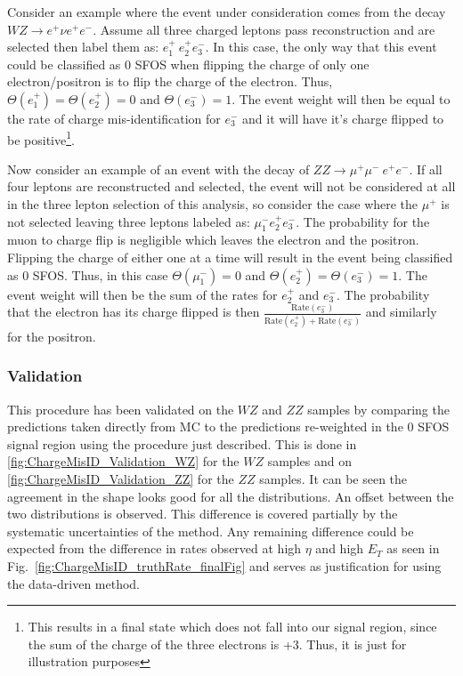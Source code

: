 Consider an example where the event under consideration comes from the 
decay $WZ\rightarrow e^{+}\nu e^{+}e^{-}$. Assume all three charged leptons 
pass reconstruction and are selected then label 
them as: $e^{+}_1~e^{+}_2e^{-}_3$. In this case,
the only way that this event could be classified as 0 SFOS when 
flipping the charge of only one electron/positron is to flip the 
charge of the electron.
Thus, $\Theta(e^{+}_1)=\Theta(e^{+}_2)=0$ and $\Theta(e^{-}_3)=1$.  The event 
weight will then be equal to the rate of charge mis-identification 
for  $e^{-}_3$ and it will have it's charge flipped 
to be positive\footnote{This results in a final state
which does not fall into our signal region, since the sum of the
charge of the three electrons is +3. Thus, it is just for illustration purposes}.

Now consider an example of an event with 
the decay of $ZZ\rightarrow \mu^{+}\mu^{-}~ e^{+}e^{-}$.
If all four leptons are reconstructed and selected, the event will not 
be considered at all in the three lepton selection of this analysis, so 
consider the case where the $\mu^{+}$ is not selected leaving three leptons 
labeled as: $\mu^{-}_1 e^{+}_2 e^{-}_3$.  The probability for the muon to 
charge flip is negligible which leaves the electron and the positron. Flipping 
the charge of either one at a time will result in the event being 
classified as 0 SFOS.  Thus, in
this case $\Theta(\mu^{-}_1)=0$ and $\Theta(e^{+}_2)=\Theta(e^{-}_3)=1$. The 
event weight will then be the sum of the rates for $e^{+}_2$ and $e^{-}_3$.
The probability that the electron has its charge flipped is then 
$\frac{\textrm{Rate}(e^{-}_3) }{ \textrm{Rate}(e^{+}_2)+ \textrm{Rate}(e^{-}_3)}$ 
and similarly for the positron.

\subsubsection{Validation}
\label{sec:chargemisid_validation}
This procedure has been validated on the $WZ$ and $ZZ$ samples by comparing 
the predictions taken directly from MC to the predictions re-weighted in the 
0 SFOS signal region using the procedure just described. This is done in 
\fig\ref{fig:ChargeMisID_Validation_WZ} for the $WZ$ samples and on 
\fig\ref{fig:ChargeMisID_Validation_ZZ} for the $ZZ$ samples. It can be seen 
the agreement in the shape looks good for all the distributions. An offset 
between the two distributions is observed. This difference is covered partially by 
the systematic uncertainties of the method.  Any remaining difference could 
be expected from the difference in rates observed at high $\eta$ and 
high $E_{T}$ as seen in Fig.~\ref{fig:ChargeMisID_truthRate_finalFig} and 
serves as justification for using the data-driven method.


